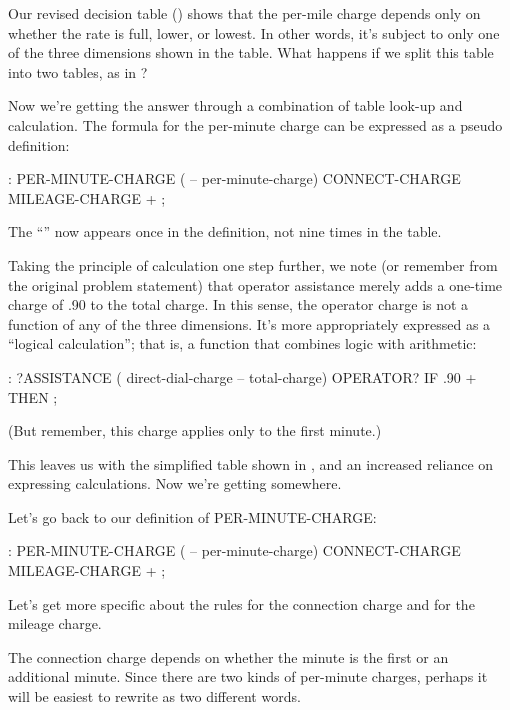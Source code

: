 Our revised decision table () shows that the per-mile
charge depends only on whether the rate is full, lower, or lowest. In
other words, it's subject to only one of the three dimensions shown in
the table.  What happens if we split this table into two tables, as in
?


Now we're getting the answer through a combination of table look-up
and calculation. The formula for the per-minute charge can be
expressed as a pseudo\Forth{} definition:

\begin{Code}
: PER-MINUTE-CHARGE ( -- per-minute-charge)
        CONNECT-CHARGE  MILEAGE-CHARGE  + ;
\end{Code}
The ``\forth{+}'' now appears once in the definition,
not nine times in the table.

Taking the principle of calculation one step further, we note (or
remember from the original problem statement) that operator assistance
merely adds a one-time charge of .90 to the total charge. In this
sense, the operator charge is not a function of any of the three
dimensions. It's more
appropriately expressed as a ``logical calculation''; that is, a
function that combines logic with arithmetic:

\begin{Code}
: ?ASSISTANCE
   ( direct-dial-charge -- total-charge)
   OPERATOR? IF .90 + THEN ;
\end{Code}
(But remember, this charge applies only to the first minute.)


This leaves us with the simplified table shown in , and an
increased reliance on expressing calculations. Now we're getting
somewhere.

Let's go back to our definition of PER-MINUTE-CHARGE:
\begin{Code}
: PER-MINUTE-CHARGE ( -- per-minute-charge)
   CONNECT-CHARGE  MILEAGE-CHARGE  + ;
\end{Code}
Let's get more specific about the rules for the connection charge and for
the mileage charge.

The connection charge depends on whether the minute is the first or
an additional minute. Since there are two kinds of per-minute charges,
perhaps it will be easiest to rewrite  as two
different words.

